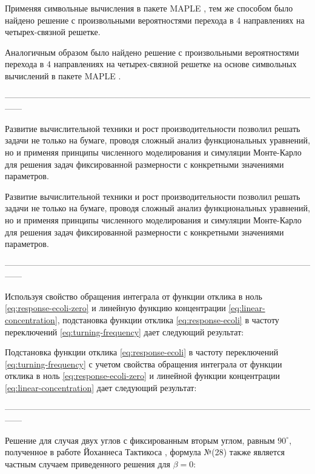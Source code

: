 Применяя символьные вычисления в пакете MAPLE \cite{monagan2012maple}, тем же способом было найдено решение с произвольными вероятностями перехода в 4 направлениях на четырех-связной решетке. 

Аналогичным образом было найдено решение с произвольными вероятностями перехода в 4 направлениях на четырех-связной решетке на основе символьных вычислений в пакете MAPLE \cite{monagan2012maple}. 

------------------------------------------------------------------------------------------------------------------

Развитие вычислительной техники и рост производительности позволил решать задачи не только на бумаге, проводя сложный анализ функциональных уравнений, но и применяя принципы численного моделирования и симуляции Монте-Карло \cite{Sobol_monte-carlo_1968} для решения задач фиксированной размерности с конкретными значениями параметров.

Развитие вычислительной техники и рост производительности позволил решать задачи не только на бумаге, проводя сложный анализ функциональных уравнений, но и применяя принципы численного моделирования и симуляции Монте-Карло \cite{Sobol_monte-carlo_1968} для решения задач фиксированной размерности с конкретными значениями параметров.


------------------------------------------------------------------------------------------------------------------

Используя свойство обращения интеграла от функции отклика в ноль \cref{eq:response-ecoli-zero} и линейную функцию концентрации \cref{eq:linear-concentration}, подстановка функции отклика \cref{eq:response-ecoli} в частоту переключений \cref{eq:turning-frequency} дает следующий результат:

Подстановка функции отклика \cref{eq:response-ecoli} в частоту переключений \cref{eq:turning-frequency} с учетом свойства обращения интеграла от функции отклика в ноль \cref{eq:response-ecoli-zero} и линейной функции концентрации \cref{eq:linear-concentration} дает следующий результат:

------------------------------------------------------------------------------------------------------------------

Решение для случая двух углов с фиксированным вторым углом, равным $90^\circ$, полученное в работе Йоханнеса Тактикоса \cite{taktikos_how_2013}, формула №(28) также является частным случаем приведенного решения для $\beta=0$:

